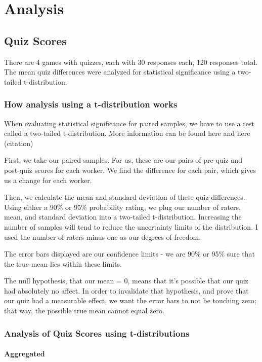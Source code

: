 \chapter{Analysis}

	\section{Quiz Scores}
		There are 4 games with quizzes, each with 30 responses each, 120 responses total. The mean quiz differences were analyzed for statistical significance using a two-tailed t-distribution.

		\subsection{How analysis using a t-distribution works}

			When evaluating statistical significance for paired samples, we have to use a test called a two-tailed t-distribution. More information can be found here and here (citation)

			First, we take our paired samples. For us, these are our pairs of pre-quiz and post-quiz scores for each worker. We find the difference for each pair, which gives us a change for each worker.

			Then, we calculate the mean and standard deviation of these quiz differences. Using either a 90\% or 95\% probability rating, we plug our number of raters, mean, and standard deviation into a two-tailed t-distribution. Increasing the number of samples will tend to reduce the uncertainty limits of the distribution. I used the number of raters minus one as our degrees of freedom.

			The error bars displayed are our confidence limits - we are 90\% or 95\% sure that the true mean lies within these limits. 

			The null hypothesis, that our mean = 0, means that it's possible that our quiz had absolutely no affect. In order to invalidate that hypothesis, and prove that our quiz had a measurable effect, we want the error bars to not be touching zero; that way, the possible true mean cannot equal zero.

		\subsection{Analysis of Quiz Scores using t-distributions}

			\subsubsection{Aggregated}

